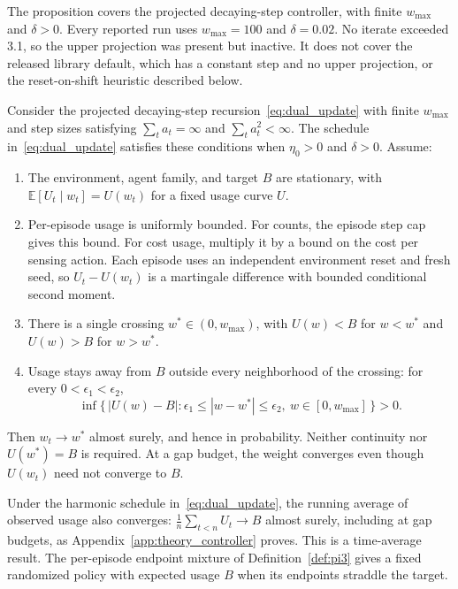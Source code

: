 \documentclass[manuscript, screen, review]{jair}
\begin{document}
The proposition covers the projected decaying-step controller, with finite $w_{\max}$ and $\delta>0$. Every reported run uses $w_{\max}=100$ and $\delta=0.02$. No iterate exceeded 3.1, so the upper projection was present but inactive. It does not cover the released library default, which has a constant step and no upper projection, or the reset-on-shift heuristic described below.

\begin{proposition}
\label{prop:pi5}
Consider the projected decaying-step recursion~\eqref{eq:dual_update} with finite $w_{\max}$ and step sizes satisfying $\sum_t a_t=\infty$ and $\sum_t a_t^2<\infty$. The schedule in~\eqref{eq:dual_update} satisfies these conditions when $\eta_0>0$ and $\delta>0$. Assume:
\begin{enumerate}
\item[(i)] The environment, agent family, and target $B$ are stationary, with $\mathbb{E}[U_t\mid w_t]=U(w_t)$ for a fixed usage curve $U$.
\item[(ii)] Per-episode usage is uniformly bounded. For counts, the episode step cap gives this bound. For cost usage, multiply it by a bound on the cost per sensing action. Each episode uses an independent environment reset and fresh seed, so $U_t-U(w_t)$ is a martingale difference with bounded conditional second moment.
\item[(iii)] There is a single crossing $w^*\in(0,w_{\max})$, with $U(w)<B$ for $w<w^*$ and $U(w)>B$ for $w>w^*$.
\item[(iv)] Usage stays away from $B$ outside every neighborhood of the crossing: for every $0<\epsilon_1<\epsilon_2$,
\[
\inf\{\,|U(w)-B|:\epsilon_1\le|w-w^*|\le\epsilon_2,\ w\in[0,w_{\max}]\,\}>0.
\]
\end{enumerate}
Then $w_t\to w^*$ almost surely, and hence in probability. Neither continuity nor $U(w^*)=B$ is required. At a gap budget, the weight converges even though $U(w_t)$ need not converge to $B$.

Under the harmonic schedule in~\eqref{eq:dual_update}, the running average of observed usage also converges: $\frac1n\sum_{t<n}U_t\to B$ almost surely, including at gap budgets, as Appendix~\ref{app:theory_controller} proves. This is a time-average result. The per-episode endpoint mixture of Definition~\ref{def:pi3} gives a fixed randomized policy with expected usage $B$ when its endpoints straddle the target.
\end{proposition}
\end{document}
